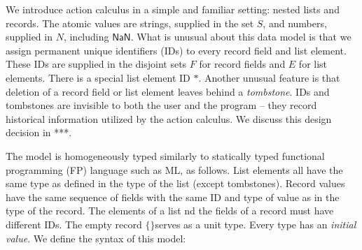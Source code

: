 \documentclass[english,submission]{programming}
\theoremstyle{definition}
\newcommand{\mathbox}[1]{\colorbox{black!10}{$#1$}}
\newcommand{\emptystring}{\textsf{\textquotedbl\ \!\textquotedbl}}
\begin{document}
We introduce action calculus in a simple and familiar setting: nested lists and records. The atomic values are strings, supplied in the set \mathbox{S}, and numbers, supplied in \mathbox{N}, including \mathbox{\textsf{NaN}}. What is unusual about this data model is that we assign permanent unique identifiers (IDs) to every record field and list element. These IDs are supplied in the disjoint sets \mathbox{F} for record fields and \mathbox{E} for list elements. There is a special list element ID \mathbox{*}. Another unusual feature is that deletion of a record field or list element leaves behind a \textit{tombstone}. IDs and tombstones are invisible to both the user and the program -- they record historical information utilized by the action calculus. We discuss this design decision in ***.

The model is homogeneously typed similarly to statically typed functional programming (FP) language such as ML, as follows. List elements all have the same type as defined in the type of the list (except tombstones). Record values have the same sequence of fields with the same ID and type of value as in the type of the record. The elements of a list nd the fields of a record must have different IDs.
The empty record \mathbox{\text{\{\}}}serves as a unit type. Every type has an \textit{initial value}. We define the syntax of this model:

\tcbox{
\[ \begin{array}{rl|rl|rl|l}
  \multicolumn{2}{l|}{\textrm{type}} & \multicolumn{2}{l|}{\textrm{value}} & \multicolumn{2}{l|}{\textrm{initial value}}&\\
  \hline
  T \Coloneqq & & v \Coloneqq & & T^\varnothing = & &\\
  &  \textsf{String} & & S & & \emptystring & \textrm{string}\\
  & \textsf{Number} & &  N & & \textsf{NaN} & \textrm{number}\\
  & \textsf{List } T & & [ E : v \  \dots ] & & [] & \textrm{list}\\
  & \{ F : T \  \dots \} & & \{ F : v \  \dots \} & & \{ F : T^\varnothing \  \dots \}& \textrm{record}\\

  & \bot && \bigtimes & & \bigtimes & \textrm{tombstone}\\
\end{array}\]
}
\end{document}
